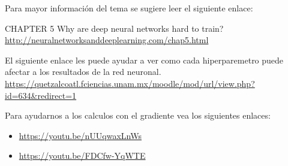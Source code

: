 Para mayor información del tema se sugiere leer el siguiente enlace:

CHAPTER 5 Why are deep neural networks hard to train? \url{http://neuralnetworksanddeeplearning.com/chap5.html}

El siguiente enlace les puede ayudar a ver como cada hiperparemetro puede afectar a los resultados de la red neuronal.
\url{https://quetzalcoatl.fciencias.unam.mx/moodle/mod/url/view.php?id=634&redirect=1}

Para ayudarnos a los calculos con el gradiente vea los siguientes enlaces:
\begin{itemize}
 \item \url{https://youtu.be/nUUqwaxLnWs}
 \item \url{https://youtu.be/FDCfw-YqWTE}
 \end{itemize}

